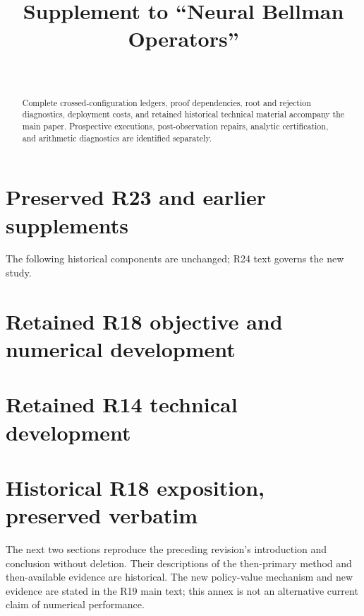 \documentclass[ecta]{econsocart}
\theoremstyle{remark}
\begin{document}
\begin{frontmatter}
\title{Supplement to ``Neural Bellman Operators''}
\begin{aug}
\author[id=au1,addressref={add1}]{~}
\address[id=add1]{}
\end{aug}
\begin{abstract}Complete crossed-configuration ledgers, proof dependencies, root and rejection diagnostics, deployment costs, and retained historical technical material accompany the main paper. Prospective executions, post-observation repairs, analytic certification, and arithmetic diagnostics are identified separately.\end{abstract}
\end{frontmatter}

\clearpage\section{Preserved R23 and earlier supplements}
The following historical components are unchanged; R24 text governs the new study.





\section{Retained R18 objective and numerical development}


\section{Retained R14 technical development}

\clearpage
\section{Historical R18 exposition, preserved verbatim}
The next two sections reproduce the preceding revision's introduction and conclusion without deletion. Their descriptions of the then-primary method and then-available evidence are historical. The new policy-value mechanism and new evidence are stated in the R19 main text; this annex is not an alternative current claim of numerical performance.
\begingroup\let\historylabel\label\renewcommand{\label}[1]{\historylabel{historical-r18-#1}}


\endgroup
\clearpage
\end{document}
